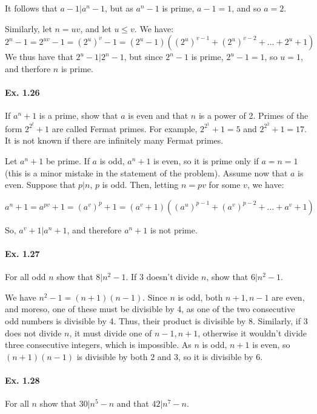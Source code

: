 \documentclass[notitlepage]{article}
\theoremstyle{definition}
\begin{document}
It follows that $a-1|a^n - 1$, but as $a^n - 1$ is prime, $a-1 = 1$,
and so $a = 2$.

Similarly, let $n = uv$, and let $u \leq v$. We have:
\begin{equation}
  2^n - 1 = 2^{uv} - 1 = (2^{u})^v - 1 = (2^u-1)((2^u)^{v-1} + (2^u)^{v-2} + \ldots + 2^u + 1)
\end{equation}
We thus have that $2^u - 1 | 2^n - 1$, but since $2^n - 1$ is prime,
$2^u -1 = 1$, so $u = 1$, and therfore $n$ is prime.

\paragraph{Ex. 1.26}
If $a^n + 1$ is a prime, show that $a$ is even and that $n$ is a power
of 2. Primes of the form $2^{2^t} + 1$ are called Fermat primes. For
example, $2^{2^1} + 1 = 5$ and $2^{2^2} + 1 = 17$.  It is not known if
there are infinitely many Fermat primes.

Let $a^n + 1$ be prime. If $a$ is odd, $a^n + 1$ is even, so it is
prime only if $a = n = 1$ (this is a minor mistake in the statement of
the problem). Assume now that $a$ is even. Suppose that $p | n$, $p$
is odd. Then, letting $n = pv$ for some $v$, we have:

\begin{equation}
  a^n + 1 = a^{pv} + 1 = (a^v)^p + 1 = (a^v+1)((a^u)^{p-1} + (a^v)^{p-2} + \ldots + a^v + 1)
\end{equation}

So, $a^v + 1|a^n + 1$, and therefore $a^n + 1$ is not prime.

\paragraph{Ex. 1.27}
For all odd $n$ show that $8| n^2 - 1$. If $3$ doesn't divide $n$,
show that $6| n^2 - 1$.

We have $n^2 - 1 = (n+1)(n-1)$. Since $n$ is odd, both $n+1, n-1$ are
even, and moreso, one of these must be divisible by 4, as one of the
two consecutive odd numbers is divisible by 4. Thus, their product is
divisible by $8$. Similarly, if $3$ does not divide $n$, it must
divide one of $n-1, n+1$, otherwise it wouldn't divide three
consecutive integers, which is impossible. As $n$ is odd, $n+1$ is
even, so $(n+1)(n-1)$ is divisible by both $2$ and $3$, so it is
divisible by $6$.

\paragraph{Ex. 1.28}
For all $n$ show that $30 | n^5 - n$ and that $42| n^7 - n$.
\end{document}
